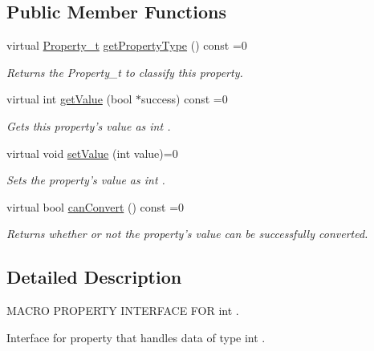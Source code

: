 \subsection*{Public Member Functions}
\begin{DoxyCompactItemize}
\item 
virtual \hyperlink{group___property_classes_ga38f1ccddda12c7cb50b868c9f789ee37}{Property\-\_\-t} \hyperlink{class_i_int_property_a09151bc49652e07a8b616d192d2f0401}{get\-Property\-Type} () const =0
\begin{DoxyCompactList}\small\item\em Returns the Property\-\_\-t to classify this property. \end{DoxyCompactList}\item 
virtual int \hyperlink{class_i_int_property_a32bd5be46bee5c4a53180498767f51d0}{get\-Value} (bool $\ast$success) const =0
\begin{DoxyCompactList}\small\item\em Gets this property's value as int . \end{DoxyCompactList}\item 
virtual void \hyperlink{class_i_int_property_a6ba40997660af79851cbeaff5180e61d}{set\-Value} (int value)=0
\begin{DoxyCompactList}\small\item\em Sets the property's value as int . \end{DoxyCompactList}\item 
virtual bool \hyperlink{class_i_int_property_a25375f7c817ab7a1aeaef72a5bcfafdd}{can\-Convert} () const =0
\begin{DoxyCompactList}\small\item\em Returns whether or not the property's value can be successfully converted. \end{DoxyCompactList}\end{DoxyCompactItemize}


\subsection{Detailed Description}
M\-A\-C\-R\-O P\-R\-O\-P\-E\-R\-T\-Y I\-N\-T\-E\-R\-F\-A\-C\-E F\-O\-R int . 

Interface for property that handles data of type int . 

